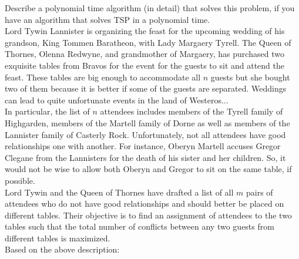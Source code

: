 \documentclass{article}
\begin{document}
 Describe a polynomial time algorithm (in detail)
that solves this problem, if you have an algorithm that solves TSP in
a polynomial time. \\

 Lord Tywin Lannister is
organizing the feast for the upcoming wedding of his grandson, King
Tommen Baratheon, with Lady Margaery Tyrell. The Queen of Thornes,
Olenna Redwyne, and grandmother of Margaery, has purchased two
exquisite tables from Bravos for the event for the guests to sit and
attend the feast. These tables are big enough to accommodate all $n$
guests but she bought two of them because it is better if some of the
guests are separated. Weddings can lead to quite unfortunate events in
the land of Westeros...\\

\noindent In particular, the list of $n$ attendees includes members of
the Tyrell family of Highgarden, members of the Martell family of
Dorne as well as members of the Lannister family of Casterly
Rock. Unfortunately, not all attendees have good relationships one
with another. For instance, Oberyn Martell accuses Gregor Clegane from
the Lannisters for the death of his sister and her children. So, it
would not be wise to allow both Oberyn and Gregor to sit on the same
table, if possible.\\

\noindent Lord Tywin and the Queen of Thornes have drafted a list of
all $m$ pairs of attendees who do not have good relationships and
should better be placed on different tables. Their objective is to
find an assignment of attendees to the two tables such that the total
number of conflicts between any two guests from different tables is
maximized.\\

\noindent Based on the above description:
\end{document}
